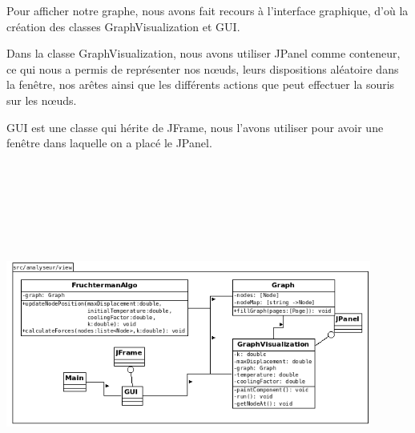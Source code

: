 \documentclass[12pt]{article}
\begin{document}
Pour afficher notre graphe, nous avons fait recours à l'interface graphique, d'où la création des classes GraphVisualization et GUI.

Dans la classe GraphVisualization, nous avons utiliser JPanel comme conteneur, ce qui nous a permis de représenter nos nœuds, leurs dispositions aléatoire dans la fenêtre, nos arêtes ainsi que les différents actions que peut effectuer la souris sur les nœuds.

GUI est une classe qui hérite de JFrame, nous l'avons utiliser pour avoir une fenêtre dans laquelle on a placé le JPanel.

\includegraphics[width=12cm,height=12cm]{images/view.png}
\end{document}

